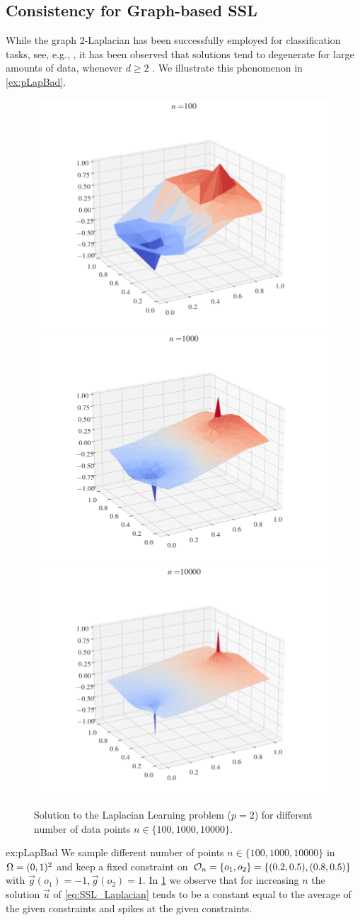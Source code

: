 \subsection{Consistency for Graph-based SSL}\label{sec:CSSL}
%
%
While the graph 2-Laplacian has been successfully employed for classification tasks, see, e.g., \cite{zhu2003semi, zhou2005regularization}, it has been observed that solutions tend to degenerate for large amounts of data, whenever $d\geq 2$ \cite{nadler2009statistical, alamgir2011phase, el2016asymptotic}. We illustrate this phenomenon in \cref{ex:pLapBad}.
%
\begin{figure}
\includegraphics[width=.28\textwidth, trim={3.1cm 1cm 3.5cm 0cm},clip]{code/SSL/2Dex_100.png}%
\hfill%
\includegraphics[width=.28\textwidth,trim={3.1cm 1cm 3.5cm 0cm},clip]{code/SSL/2Dex_1000.png}%
\hfill%
\includegraphics[width=.28\textwidth,trim={3.1cm 1cm 3.5cm 0cm},clip]{code/SSL/2Dex_10000.png}%
%
\caption[Solution to the Laplacian Learning problem for different number of data points.]{Solution to the Laplacian Learning problem ($p=2$) for different number of data points $n\in\{100,1000,10000\}$.}\label{fig:pdeg}
\end{figure}
%
%
\begin{example}{}{ex:pLapBad}
We sample different number of points $n\in\{100,1000,10000\}$ in $\Omega=(0,1)^2$ and keep a fixed constraint on $\mathcal{O}_n=\{o_1, o_2\}=\{(0.2,0.5), (0.8, 0.5)\}$ with $\vec g(o_1) = -1, \vec g(o_2)=1$. In \cref{fig:pdeg} we observe that for increasing $n$ the solution $\vec u$ of \cref{eq:SSL_Laplacian} tends to be a constant equal to the average of the given constraints and spikes at the given constraints.
\end{example}
